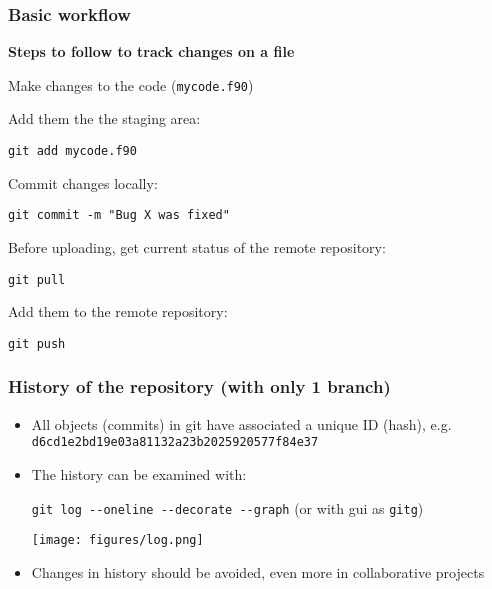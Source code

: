 \documentclass[xcolor=dvipsnames,10pt]{beamer}
\begin{document}
\begin{frame}
 \frametitle{Basic workflow}
 
 \textbf{Steps to follow to track changes on a file} 
 \vspace*{0.5cm}
 
 \begin{enumerate}
  \item Make changes to the code (\texttt{mycode.f90})
  \vspace*{0.2cm}
  
  \item Add them the the staging area: 
  
  \texttt{git add mycode.f90} 
  \vspace*{0.2cm}
  
  \item Commit changes locally:
  
  \texttt{git commit -m "Bug X was fixed"}
  \vspace*{0.2cm}
  
  {
  \color{blue}
  \item[*] Before uploading, get current status of the remote repository:
  
  \texttt{git pull}
  }
  \vspace*{0.2cm}
  
  
  \item Add them to the remote repository:
  
  \texttt{git push}
 \end{enumerate}

\end{frame}



\begin{frame}
 \frametitle{History of the repository (with only 1 branch)}
 
 \begin{itemize}
  \item All objects (commits) in git have associated a unique ID (hash), e.g. \texttt{d6cd1e2bd19e03a81132a23b2025920577f84e37}
  \vspace*{0.2cm}
  
  \item The history can be examined with:

  \texttt{git log -{}-oneline -{}-decorate -{}-graph} (or with gui as \texttt{gitg}) 
  \begin{center}
   \texttt{[image: figures/log.png]}
  \end{center}
    \vspace*{0.2cm}

   \item Changes in history should be avoided, even more in collaborative projects
  
 \end{itemize}

 
\end{frame}
\end{document}
